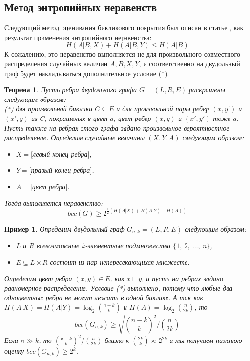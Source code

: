 \documentclass[a4paper]{article}
\newtheorem*{mtheorem}{Теорема}
\newtheorem*{mexample}{Пример}
\begin{document}
\subsection{Метод энтропийных неравенств}

Следующий метод оценивания бикликового покрытия был описан в статье \cite{EntropyInequality}, как результат 
применения энтропийного неравенства: $$H(A|B,X) + H(A|B,Y) \leq H(A|B)$$ К сожалению, это неравенство 
выполняется не для произвольного совместного распределения случайных величин $A, B, X, Y$, и соответственно 
на двудольный граф будет накладываться дополнительное условие (*).

\begin{mtheorem}
    Пусть ребра двудольного графа $G = (L, R, E)$ раскрашены следующим образом:\ \\
    (*) для произвольной биклики $C\subseteq E$ и для произвольной пары ребер $(x, y')$ и $(x', y)$ 
    из $C$, покрашеных в цвет $a$, цвет ребер $(x, y)$ и $(x', y')$ тоже $a$.\ \\
    Пусть также на ребрах этого графа задано произвольное вероятностное распределение. Определим случайные 
    величины $(X, Y, A)$ следующим образом:
    \begin{itemize}[noitemsep]
        \item $X = [$левый конец ребра$]$, 
        \item $Y = [$правый конец ребра$]$,
        \item $A = [$цвет ребра$]$.
    \end{itemize}
    Тогда выполняется неравенство: $$bcc(G) \geq 2^{\frac{1}{2}(H(A|X) + H(A|Y) - H(A))}$$
\end{mtheorem}

\begin{mexample}
    Определим двудольный граф $G_{n,k} = (L, R, E)$ следующим образом: 
    \begin{itemize}[noitemsep]
        \item $L$ и $R$ всевозможные $k$-элементные подмножества $\{1,\ 2,\ \ldots,\ n\}$,
        \item $E\subseteq L\times R$ состоит из пар непересекающихся множеств.
    \end{itemize}
    Определим цвет ребра $(x, y)\in E$, как $x\sqcup y$, и пусть на ребрах задано равномерное распределение.
    Условие (*) выполнено, потому что любые два одноцветных ребра не могут лежать в одной биклике. А так как 
    $H(A|X) = H(A|Y) = \log_2\binom{n-k}{k}$ и $H(A) = \log_2\binom{n}{2k}$, то $$bcc(G_{n,k}) \geq 
    \sqrt{\binom{n-k}{k}^2 / \binom{n}{2k}}$$
    Если $n \gg k$, то $\binom{n-k}{k}^2 / \binom{n}{2k}$ близко к $\binom{2k}{k}\approx 2^{2k}$ и мы 
    получаем нижнюю оценку $bcc(G_{n,k})\geq 2^k$.
\end{mexample}
\end{document}
